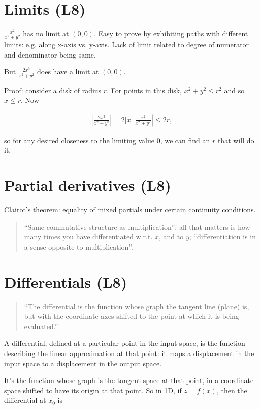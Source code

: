 \documentclass[12pt]{article}
\begin{document}
\section*{Limits (L8)}

$\frac{x^2}{x^2 + y^2}$ has no limit at $(0, 0)$.
Easy to prove by exhibiting paths with different limits: e.g. along x-axis vs. y-axis.
Lack of limit related to degree of numerator and denominator being same.

But $\frac{2x^3}{x^2 + y^2}$ does have a limit at $(0, 0)$.

Proof: consider a disk of radius $r$. For points in this disk, $x^2 + y^2 \leq r^2$ and so $x \leq r$.
Now

\begin{align*}
  \left|\frac{2x^3}{x^2 + y^2}\right| = 2|x|\left|\frac{x^2}{x^2 + y^2}\right| \leq 2r,
\end{align*}

so for any desired closeness to the limiting value 0, we can find an $r$ that will do it.

\section*{Partial derivatives (L8)}

Clairot's theorem: equality of mixed partials under certain continuity
conditions.

\begin{quote}
``Same commutative structure as multiplication''; all that matters
is how many times you have differentiated w.r.t. $x$, and to $y$;
``differentiation is in a sense opposite to multiplication''.
\end{quote}

\section*{Differentials (L8)}

\begin{quote}
  ``The differential is the function whose graph the tangent line (plane) is,
  but with the coordinate axes shifted to the point at which it is being
  evaluated.''
\end{quote}

A differential, defined at a particular point in the input space, is the
function describing the linear approximation at that point: it maps a
displacement in the input space to a displacement in the output space.

It's the function whose graph is the tangent space at that point, in a
coordinate space shifted to have its origin at that point. So in 1D, if
$z = f(x)$, then the differential at $x_0$ is
\end{document}
